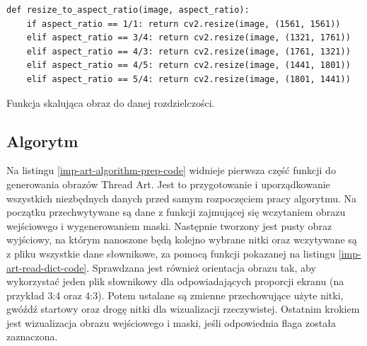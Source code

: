         \begin{code}[H]
        \begin{verbatim}
def resize_to_aspect_ratio(image, aspect_ratio):
    if aspect_ratio == 1/1: return cv2.resize(image, (1561, 1561))
    elif aspect_ratio == 3/4: return cv2.resize(image, (1321, 1761))
    elif aspect_ratio == 4/3: return cv2.resize(image, (1761, 1321))
    elif aspect_ratio == 4/5: return cv2.resize(image, (1441, 1801))
    elif aspect_ratio == 5/4: return cv2.resize(image, (1801, 1441))
        \end{verbatim}
        \caption{Funkcja skalująca obraz do danej rozdzielczości.}
        \label{imp-art-input-resize-code}
        \end{code}
        
        \subsection{Algorytm} \label{imp-art-alg}
        Na listingu \ref{imp-art-algorithm-prep-code} widnieje pierwsza część funkcji do generowania obrazów Thread Art. Jest to przygotowanie i uporządkowanie wszystkich niezbędnych danych przed samym rozpoczęciem pracy algorytmu. Na początku przechwytywane są dane z funkcji zajmującej się wczytaniem obrazu wejściowego i wygenerowaniem maski. Następnie tworzony jest pusty obraz wyjściowy, na którym nanoszone będą kolejno wybrane nitki oraz wczytywane są z pliku wszystkie dane słownikowe, za pomocą funkcji pokazanej na listingu \ref{imp-art-read-dict-code}. Sprawdzana jest również orientacja obrazu tak, aby wykorzystać jeden plik słownikowy dla odpowiadających proporcji ekranu (na przykład 3:4 oraz 4:3). Potem ustalane są zmienne przechowujące użyte nitki, gwóźdź startowy oraz drogę nitki dla wizualizacji rzeczywistej. Ostatnim krokiem jest wizualizacja obrazu wejściowego i maski, jeśli odpowiednia flaga została zaznaczona. 
        
